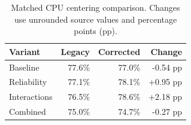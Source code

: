 \begin{table}[t]
\caption{Matched CPU centering comparison. Changes use unrounded source values and percentage points (pp).}
\label{tab:center}\centering
\begin{tabular}{lrrr}
\toprule
Variant & Legacy & Corrected & Change\\
\midrule
Baseline & 77.6\% & 77.0\% & -0.54 pp\\
Reliability & 77.1\% & 78.1\% & +0.95 pp\\
Interactions & 76.5\% & 78.6\% & +2.18 pp\\
Combined & 75.0\% & 74.7\% & -0.27 pp\\
\bottomrule
\end{tabular}
\end{table}
